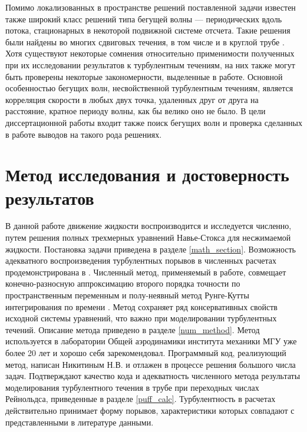 Помимо локализованных в пространстве решений поставленной задачи известен также широкий класс решений типа бегущей волны --- периодических вдоль потока, стационарных в некоторой подвижной системе отсчета. Такие решения были найдены во многих сдвиговых течения, в том числе и в круглой трубе \cite{Kawahara2012}. Хотя существуют некоторые сомнения относительно применимости полученных при их исследовании результатов к турбулентным течениям, на них также могут быть проверены некоторые закономерности, выделенные в работе. Основной особенностью бегущих волн, несвойственной турбулентным течениям, является корреляция скорости в любых двух точка, удаленных друг от друга на расстояние, кратное периоду волны, как бы велико оно не было. В цели диссертационной работы входит также поиск бегущих волн и проверка сделанных в работе выводов на такого рода решениях. 


\section{Метод исследования и достоверность результатов}

В данной работе движение жидкости воспроизводится и исследуется численно, путем решения полных трехмерных уравнений Навье-Стокса для несжимаемой жидкости. Постановка задачи приведена в разделе \ref{math_section}. Возможность адекватного воспроизведения турбулентных порывов в численных расчетах продемонстрирована в \cite{Priymak2004}. Численный метод, применяемый в работе, совмещает конечно-разносную аппроксимацию второго порядка точности по пространственным переменным и полу-неявный метод Рунге-Кутты интегрирования по времени \cite{Nikitin2006, Nikitin2006third}. Метод сохраняет ряд консервативных свойств исходной системы уравнений, что важно при моделировании турбулентных течений. Описание метода приведено в разделе \ref{num_method}. Метод используется в лаборатории Общей аэродинамики института механики МГУ уже более 20 лет и хорошо себя зарекомендовал. Программный код, реализующий метод, написан Никитиным Н.В. и отлажен в процессе решения большого числа задач. Подтверждают качество кода и адекватность численного метода результаты моделирования турбулентного течения в трубе при переходных числах Рейнольдса, приведенные в разделе \ref{puff_calc}. Турбулентность в расчетах действительно принимает форму порывов, характеристики которых совпадают с представленными в литературе данными. 

